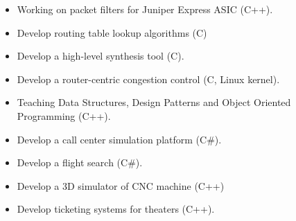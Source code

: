 \begin{itemize}
	\item Working on packet filters for Juniper Express ASIC (C++).
\end{itemize}

\divider

\begin{itemize}
	\item Develop routing table lookup algorithms (C)
	\item Develop a high-level synthesis tool (C).
	\item Develop a router-centric congestion control (C, Linux kernel).
	\item Teaching Data Structures, Design Patterns and Object Oriented Programming (C++).
\end{itemize}

\divider

\begin{itemize}
	\item Develop a call center simulation platform (C\#).
\end{itemize}

\divider

\begin{itemize}
	\item Develop a flight search (C\#).
\end{itemize}

\divider

\begin{itemize}
\item Develop a 3D simulator of CNC machine (C++)
\end{itemize}

\divider

\begin{itemize}
	\item Develop ticketing systems for theaters (C++).
\end{itemize}

